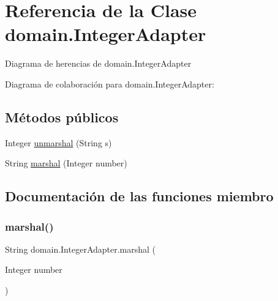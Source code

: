 \hypertarget{classdomain_1_1_integer_adapter}{}\section{Referencia de la Clase domain.\+Integer\+Adapter}
\label{classdomain_1_1_integer_adapter}


Diagrama de herencias de domain.\+Integer\+Adapter


Diagrama de colaboración para domain.\+Integer\+Adapter\+:
\subsection*{Métodos públicos}
\begin{DoxyCompactItemize}
\item 
Integer \mbox{\hyperlink{classdomain_1_1_integer_adapter_ad2bfc5af140573682dd03906b9264b51}{unmarshal}} (String s)
\item 
String \mbox{\hyperlink{classdomain_1_1_integer_adapter_a407b4872b78e54ed80c9ae597cae2451}{marshal}} (Integer number)
\end{DoxyCompactItemize}


\subsection{Documentación de las funciones miembro}
\mbox{\label{classdomain_1_1_integer_adapter_a407b4872b78e54ed80c9ae597cae2451}} 
\subsubsection{\texorpdfstring{marshal()}{marshal()}}
{\footnotesize\ttfamily String domain.\+Integer\+Adapter.\+marshal (\begin{DoxyParamCaption}\item[{Integer}]{number }\end{DoxyParamCaption})}

\mbox{\label{classdomain_1_1_integer_adapter_ad2bfc5af140573682dd03906b9264b51}} 
